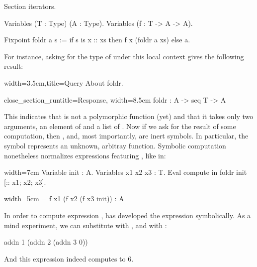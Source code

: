 \begin{coq}{}{}
Section iterators.

Variables (T : Type) (A : Type).
Variables (f : T -> A -> A).

Fixpoint foldr a s :=
  if s is x :: xs then f x (foldr a xs) else a.
\end{coq}

For instance, asking for the type of
  under this local context gives the following result:

\begin{coq}{}{width=3.5cm,title=Query}
About foldr.
\end{coq}
\begin{coqout}{close_section_run}{title=Response, width=8.5cm}
foldr : A -> seq T -> A
\end{coqout}

This indicates that  is not a polymorphic function (yet)
and that it takes only two arguments, an element of  and
a list of . Now if we ask for the result of some computation,
then ,  and, most importantly,  are inert symbols.
In particular, the symbol  represents an unknown, arbitray
function. Symbolic computation nonetheless normalizes expressions
featuring , like in:

\begin{coq}{}{width=7cm}
Variable init : A.
Variables x1 x2 x3 : T.
Eval compute in
  foldr init [:: x1; x2; x3].
\end{coq}
\begin{coqout}{}{width=5cm}
= f x1 (f x2 (f x3 init))
: A
\end{coqout}

In order to compute expression ,
\Coq{} has developed the expression symbolically.  As a mind
experiment, we can substitute  with , and
\C{[:: x1; x2; x3]} with \C{[:: 1; 2; 3]}:

\begin{coq}{}{}
addn 1 (addn 2 (addn 3 0))
\end{coq}

And this expression indeed computes to 6.


